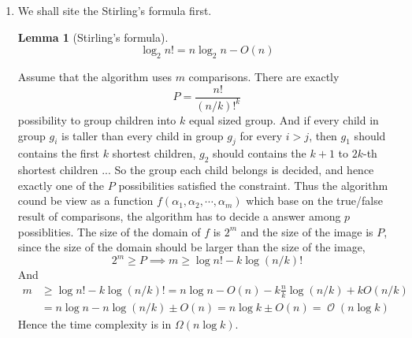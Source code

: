 \documentclass[12pt, a4paper]{article}
\newcommand{\opord}{\operatorname{\mathcal{O}}}
\newcommand{\ord}[1]{\opord\left(#1\right)}
\newtheorem{lemma}{Lemma}
\begin{document}
\begin{enumerate}
\begin{figure}[H]
  \end{figure}

\item We shall site the Stirling's formula first.
  \begin{lemma}[Stirling's formula]
    \[ \log_2 n! = n \log_2 n - O(n) \]
  \end{lemma}

  Assume that the algorithm uses $m$ comparisons. There are exactly 
  \[ P = \frac{n!}{(n/k)!^k} \]
  possibility to group children into $k$ equal sized group. And if every
  child in group $g_i$ is taller than every child in group $g_j$ for every $i > j$, 
  then $g_1$ should contains the first $k$ shortest children, $g_2$ should contains the 
  $k+1$ to $2k$-th shortest children ... So the group each child belongs is decided, and hence 
  exactly one of the $P$ possibilities
  satisfied the constraint. Thus the algorithm cound be view as a function 
  $f(\alpha_1, \alpha_2, \cdots, \alpha_m)$ which base on the true/false result of comparisons, 
  the algorithm has to decide a answer among $p$ possiblities. The size of the domain of $f$ is 
  $2^m$ and the size of the image is $P$, since the size of the domain should be larger than
  the size of the image, 
  \[ 2^m \geq P \implies m \geq \log n! - k \log (n/k)! \]
  And 
  \begin{align*}
    m &\geq \log n! - k \log (n/k)! = n \log n - O(n) - k \frac{n}{k} \log (n/k) + k O(n/k) \\
    &= n \log n - n \log (n/k) \pm O(n) = n \log k \pm O(n) = \ord{n \log k}
  \end{align*}
  Hence the time complexity is in $\Omega(n \log k)$.


\end{enumerate}
\end{document}
